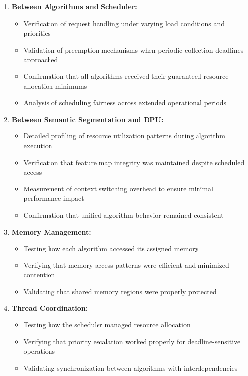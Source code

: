 \begin{enumerate}
\item \textbf{Between Algorithms and Scheduler:}
   \begin{itemize}
   \item Verification of request handling under varying load conditions and priorities
   \item Validation of preemption mechanisms when periodic collection deadlines approached
   \item Confirmation that all algorithms received their guaranteed resource allocation minimums
   \item Analysis of scheduling fairness across extended operational periods
   \end{itemize}

\item \textbf{Between Semantic Segmentation and DPU:}
   \begin{itemize}
   \item Detailed profiling of resource utilization patterns during algorithm execution
   \item Verification that feature map integrity was maintained despite scheduled access
   \item Measurement of context switching overhead to ensure minimal performance impact
   \item Confirmation that unified algorithm behavior remained consistent
   \end{itemize}

\item \textbf{Memory Management:}
   \begin{itemize}
   \item Testing how each algorithm accessed its assigned memory
   \item Verifying that memory access patterns were efficient and minimized contention
   \item Validating that shared memory regions were properly protected
   \end{itemize}

\item \textbf{Thread Coordination:}
   \begin{itemize}
   \item Testing how the scheduler managed resource allocation
   \item Verifying that priority escalation worked properly for deadline-sensitive operations
   \item Validating synchronization between algorithms with interdependencies
   \end{itemize}
\end{enumerate}

